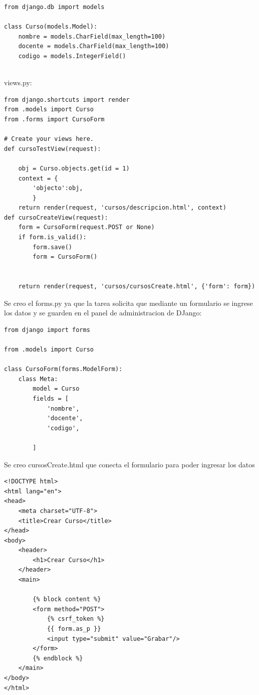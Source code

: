 \documentclass{article}
\begin{document}
\begin{lstlisting}
from django.db import models

class Curso(models.Model):
    nombre = models.CharField(max_length=100)
    docente = models.CharField(max_length=100)
    codigo = models.IntegerField()
   
\end{lstlisting}
     
\item  views.py:
 
\begin{lstlisting}
from django.shortcuts import render
from .models import Curso
from .forms import CursoForm

# Create your views here.
def cursoTestView(request):
    
    obj = Curso.objects.get(id = 1)
    context = {
        'objecto':obj,
        }
    return render(request, 'cursos/descripcion.html', context)
def cursoCreateView(request):
    form = CursoForm(request.POST or None)
    if form.is_valid():
        form.save()
        form = CursoForm()
        
    
    return render(request, 'cursos/cursosCreate.html', {'form': form})

\end{lstlisting}

 \item Se creo el forms.py ya que la tarea solicita que mediante un formulario se ingrese los datos y se guarden en  el panel de administracion de DJango:
	
\begin{lstlisting}
from django import forms

from .models import Curso

class CursoForm(forms.ModelForm):
    class Meta:
        model = Curso
        fields = [
            'nombre',
            'docente',
            'codigo',
            
        ]

\end{lstlisting}

 \item Se creo cursosCreate.html que conecta el formulario para poder ingresar los datos
 
\begin{lstlisting}
<!DOCTYPE html>
<html lang="en">
<head>
    <meta charset="UTF-8">
    <title>Crear Curso</title>
</head>
<body>
    <header>
        <h1>Crear Curso</h1>
    </header>
    <main>

        {% block content %}
        <form method="POST">
            {% csrf_token %}
            {{ form.as_p }}
            <input type="submit" value="Grabar"/>
        </form>
        {% endblock %}
    </main>
</body>
</html>


\end{lstlisting}
\end{document}
